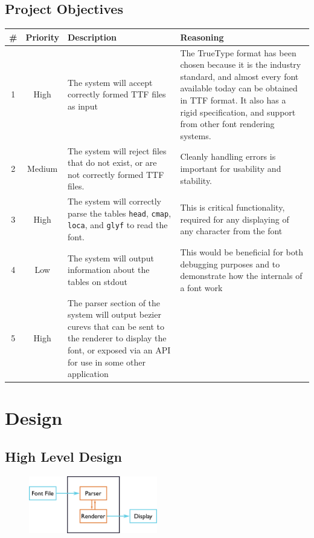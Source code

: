 \documentclass{report}
\begin{document}
\section{Project Objectives}
\begin{center}
  \begin{longtable}{c|c|p{3cm}|p{6.5cm}}
    \# & \textbf{Priority} & \textbf{Description} & \textbf{Reasoning} \\
    \hline
    1 & High & The system will accept correctly formed TTF files as input & The TrueType format has been chosen because it is the industry standard, and almost every font available today can be obtained in TTF format. It also has a rigid specification, and support from other font rendering systems. \\
    \hline
    2 & Medium & The system will reject files that do not exist, or are not correctly formed TTF files. & Cleanly handling errors is important for usability and stability. \\
    \hline
    3 & High & The system will correctly parse the tables \texttt{head}, \texttt{cmap}, \texttt{loca}, and \texttt{glyf} to read the font. & This is critical functionality, required for any displaying of any character from the font \\
    \hline
    4 & Low & The system will output information about the tables on stdout & This would be beneficial for both debugging purposes and to demonstrate how the internals of a font work \\
    \hline
    5 & High & The parser section of the system will output bezier curevs that can be sent to the renderer to display the font, or exposed via an API for use in some other application
  \end{longtable}
\end{center}


\chapter{Design}
\section{High Level Design}

\begin{figure}
  \centering
  \includegraphics[width=0.5\textwidth]{design/highlevelout}
\end{figure}
\end{document}
